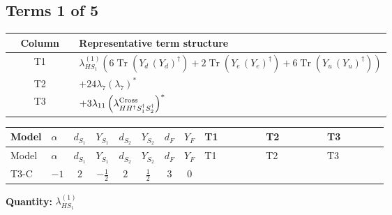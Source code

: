 \documentclass[8pt]{article}
\begin{document}
\begin{landscape}
\subsection*{Terms 1 of 5}
\begin{center}
\begin{tabular}{@{}c >{\raggedright\arraybackslash}p{0.82\linewidth}@{}}
\toprule
Column & Representative term structure \\
\midrule
T1 & \(\displaystyle {\lambda_{HS_1}^{(1)}} (6 \operatorname{Tr}\!\left({Y_d}\,\left({Y_d}\right)^{\dagger}\right)+2 \operatorname{Tr}\!\left({Y_e}\,\left({Y_e}\right)^{\dagger}\right)+6 \operatorname{Tr}\!\left({Y_u}\,\left({Y_u}\right)^{\dagger}\right))\) \\
\midrule
T2 & \(\displaystyle +24 {\lambda_{7}} \left({\lambda_{7}}\right)^{*}\) \\
\midrule
T3 & \(\displaystyle +3 {\lambda_{11}} \left({\lambda_{H H^\dagger S_1^\dagger S_2^\dagger}^{\rm Cross}}\right)^{*}\) \\
\midrule
\bottomrule
\end{tabular}
\end{center}
\smallskip
\tiny
\begin{longtable}{@{}llcccccc >{\raggedright\arraybackslash}p{0.21\linewidth} >{\raggedright\arraybackslash}p{0.21\linewidth} >{\raggedright\arraybackslash}p{0.21\linewidth}@{}}
\toprule
Model & $\alpha$ & $d_{S_1}$ & $Y_{S_1}$ & $d_{S_2}$ & $Y_{S_2}$ & $d_F$ & $Y_F$ & T1 & T2 & T3 \\
\midrule
\endfirsthead
\toprule
Model & $\alpha$ & $d_{S_1}$ & $Y_{S_1}$ & $d_{S_2}$ & $Y_{S_2}$ & $d_F$ & $Y_F$ & T1 & T2 & T3 \\
\midrule
\endhead
T3-C & $-1$ & $2$ & $-\frac{1}{2}$ & $2$ & $\frac{1}{2}$ & $3$ & $0$ & \scriptsize\adjustbox{max width=\linewidth}{$\begin{gathered} {\lambda_{HS_1}^{(1)}} (6 \operatorname{Tr}\!\left({Y_d}\,\left({Y_d}\right)^{\dagger}\right)+2 \operatorname{Tr}\!\left({Y_e}\,\left({Y_e}\right)^{\dagger}\right)+6 \operatorname{Tr}\!\left({Y_u}\,\left({Y_u}\right)^{\dagger}\right))\end{gathered}$} & \scriptsize\adjustbox{max width=\linewidth}{$\begin{gathered} +24 {\lambda_{7}} \left({\lambda_{7}}\right)^{*}\end{gathered}$} & \scriptsize\adjustbox{max width=\linewidth}{$\begin{gathered} +3 {\lambda_{11}} \left({\lambda_{H H^\dagger S_1^\dagger S_2^\dagger}^{\rm Cross}}\right)^{*}\end{gathered}$} \\
\midrule
\bottomrule
\end{longtable}
\clearpage
\noindent\textbf{Quantity: }$\lambda_{HS_1}^{(1)}$\par\smallskip

\end{landscape}
\end{document}
